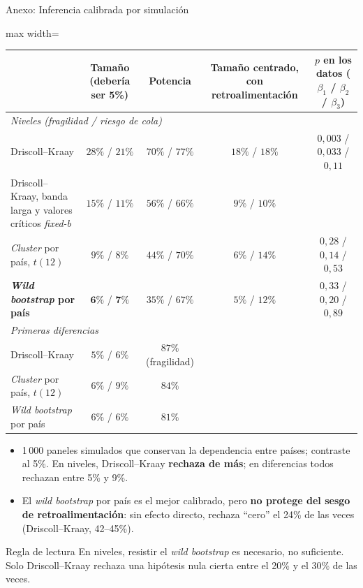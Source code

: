 \documentclass[aspectratio=169]{beamer}
\begin{document}
\begin{frame}{Anexo: Inferencia calibrada por simulación}
\centering
\footnotesize
\begin{adjustbox}{max width=\textwidth}
\begin{tabular}{l ccc c}
\toprule
 & Tamaño (debería ser 5\%) & Potencia & Tamaño centrado, con retroalimentación & $p$ en los datos ($\beta_1$ / $\beta_2$ / $\beta_3$) \\
\midrule
\multicolumn{5}{l}{\textit{Niveles (fragilidad / riesgo de cola)}} \\
Driscoll--Kraay & $28\%$ / $21\%$ & $70\%$ / $77\%$ & $18\%$ / $18\%$ & $0{,}003$ / $0{,}033$ / $0{,}11$ \\
Driscoll--Kraay, banda larga y valores críticos \textit{fixed-b} & $15\%$ / $11\%$ & $56\%$ / $66\%$ & $9\%$ / $10\%$ & \\
\textit{Cluster} por país, $t(12)$ & $9\%$ / $8\%$ & $44\%$ / $70\%$ & $6\%$ / $14\%$ & $0{,}28$ / $0{,}14$ / $0{,}53$ \\
\textbf{\textit{Wild bootstrap} por país} & $\mathbf{6\%}$ / $\mathbf{7\%}$ & $35\%$ / $67\%$ & $5\%$ / $12\%$ & $0{,}33$ / $0{,}20$ / $0{,}89$ \\
\midrule
\multicolumn{5}{l}{\textit{Primeras diferencias}} \\
Driscoll--Kraay & $5\%$ / $6\%$ & $87\%$ (fragilidad) & & \\
\textit{Cluster} por país, $t(12)$ & $6\%$ / $9\%$ & $84\%$ & & \\
\textit{Wild bootstrap} por país & $6\%$ / $6\%$ & $81\%$ & & \\
\bottomrule
\end{tabular}
\end{adjustbox}
\vspace{2pt}
\begin{itemize}\footnotesize\setlength\itemsep{1pt}
\item 1\,000 paneles simulados que conservan la dependencia entre países; contraste al 5\%. En niveles, Driscoll--Kraay \textbf{rechaza de más}; en diferencias todos rechazan entre 5\% y 9\%.
\item El \textit{wild bootstrap} por país es el mejor calibrado, pero \textbf{no protege del sesgo de retroalimentación}: sin efecto directo, rechaza ``cero'' el 24\% de las veces (Driscoll--Kraay, 42--45\%).
\end{itemize}
\vspace{-6pt}
\begin{alertblock}{Regla de lectura}
\footnotesize En niveles, resistir el \textit{wild bootstrap} es necesario, no suficiente. Solo Driscoll--Kraay rechaza una hipótesis nula cierta entre el 20\% y el 30\% de las veces.
\end{alertblock}
\end{frame}
\end{document}
